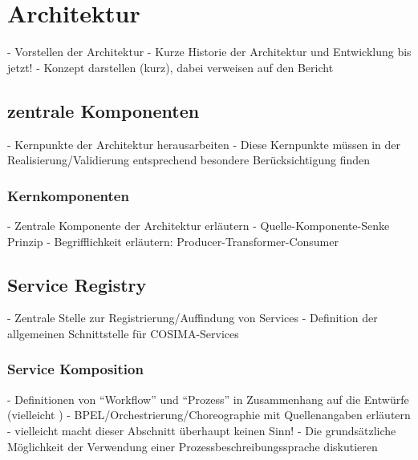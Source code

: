 
\section{Architektur} %
\label{sec:architektur}

  - Vorstellen der Architektur
  - Kurze Historie der Architektur und Entwicklung bis jetzt!
  - Konzept darstellen (kurz), dabei verweisen auf den Bericht
  
\subsection{zentrale Komponenten} %
\label{sub:zentrale_komponenten}

  - Kernpunkte der Architektur herausarbeiten
  - Diese Kernpunkte müssen in der Realisierung/Validierung entsprechend besondere Berücksichtigung finden
  
\subsubsection{Kernkomponenten} %
\label{ssub:kernkomponenten}

   - Zentrale Komponente der Architektur erläutern
   - Quelle-Komponente-Senke Prinzip
   - Begrifflichkeit erläutern: Producer-Transformer-Consumer


\subsection{Service Registry} %
\label{sub:service_registry}

  - Zentrale Stelle zur Registrierung/Auffindung von Services
  - Definition der allgemeinen Schnittstelle für COSIMA-Services


\subsubsection{Service Komposition} %
\label{ssub:service_komposition}

  - Definitionen von "`Workflow"' und "`Prozess"' in Zusammenhang auf die Entwürfe (vielleicht )
  - BPEL/Orchestrierung/Choreographie mit Quellenangaben erläutern
  - vielleicht macht dieser Abschnitt überhaupt keinen Sinn!
  - Die grundsätzliche Möglichkeit der Verwendung einer Prozessbeschreibungssprache diskutieren

